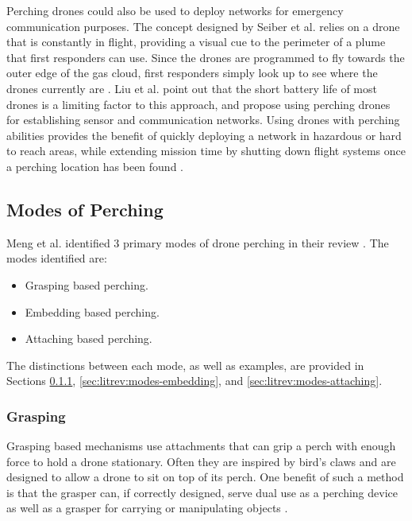 Perching drones could also be used to deploy networks for emergency communication purposes.
The concept designed by Seiber et al. relies on a drone that is constantly in flight, providing a visual cue to the perimeter of a plume
that first responders can use. Since the drones are programmed to fly towards the outer edge of the gas cloud,
first responders simply look up to see where the drones currently are \cite{seiber_tracking_2018}. Liu et al. point out
that the short battery life of most drones is a limiting factor to this approach, and propose using perching drones for 
establishing sensor and communication networks. Using drones with perching abilities provides the benefit of quickly deploying
a network in hazardous or hard to reach areas, while extending mission time by shutting down flight systems once a perching 
location has been found \cite{liu_perching_2022}.



\subsection{Modes of Perching}

Meng et al. identified 3 primary modes of drone perching in their review \cite{meng_aerial_2022}. The modes identified are:
\begin{itemize}
    \item Grasping based perching.
    \item Embedding based perching.
    \item Attaching based perching.
\end{itemize}

The distinctions between each mode, as well as examples, are provided in Sections \ref{sec:litrev:modes-grasping},
\ref{sec:litrev:modes-embedding}, and \ref{sec:litrev:modes-attaching}.


\subsubsection{Grasping} \label{sec:litrev:modes-grasping}

Grasping based mechanisms use attachments that can grip a perch with enough force to hold a drone stationary.
Often they are inspired by bird's claws and are designed to allow a drone to sit on top of its perch. One benefit
of such a method is that the grasper can, if correctly designed, serve dual use as a perching device as well as
a grasper for carrying or manipulating objects \cite{meng_aerial_2022}.

